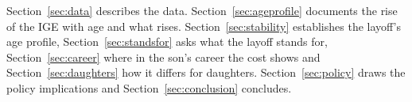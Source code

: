 Section~\ref{sec:data} describes the data. Section~\ref{sec:ageprofile} documents the rise of the IGE with age and what
rises. Section~\ref{sec:stability} establishes the layoff's age profile, Section~\ref{sec:standsfor} asks what the layoff
stands for, Section~\ref{sec:career} where in the son's career the cost shows and Section~\ref{sec:daughters} how it
differs for daughters. Section~\ref{sec:policy} draws the policy implications and Section~\ref{sec:conclusion}
concludes.
